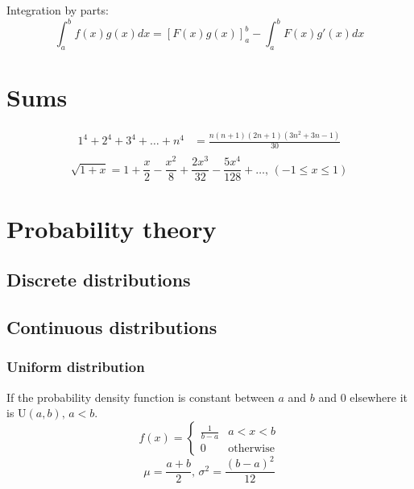 Integration by parts:
\[\int_a^bf(x)g(x)dx = [F(x)g(x)]_a^b-\int_a^bF(x)g'(x)dx\]

\section{Sums}
\begin{align*}
	1^4 + 2^4 + 3^4 + \dots + n^4 &= \frac{n(n+1)(2n+1)(3n^2 + 3n - 1)}{30} \\
\end{align*}
$$\sqrt{1+x} = 1+\frac{x}{2}-\frac{x^2}{8}+\frac{2x^3}{32}-\frac{5x^4}{128}+\dots,\,(-1\leq x\leq1)$$

\section{Probability theory}

\subsection{Discrete distributions}

\subsection{Continuous distributions}

\subsubsection{Uniform distribution}
If the probability density function is constant between $a$ and $b$ and 0 elsewhere it is $\textrm{U}(a,b),\,a<b$.
\[f(x) = \left\{
\begin{array}{cl}
\frac{1}{b-a} & a<x<b\\
0 & \textrm{otherwise}
\end{array}\right.\]
\[\mu=\frac{a+b}{2},\,\sigma^2=\frac{(b-a)^2}{12}\]

